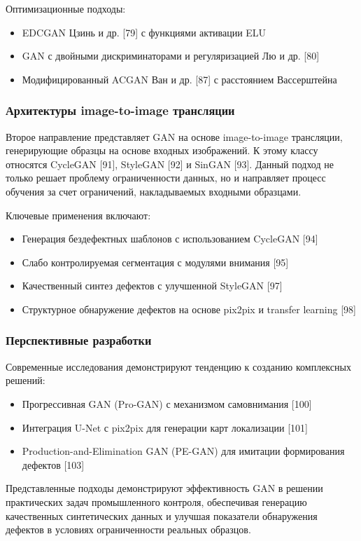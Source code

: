 \documentclass[14pt,a4paper]{article}
\begin{document}
Оптимизационные подходы:
\begin{itemize}
	\item EDCGAN Цзинь и др. [79] с функциями активации ELU
	\item GAN с двойными дискриминаторами и регуляризацией Лю и др. [80]
	\item Модифицированный ACGAN Ван и др. [87] с расстоянием Вассерштейна
\end{itemize}	

\subsubsection{Архитектуры image-to-image трансляции}

Второе направление представляет GAN на основе image-to-image трансляции, генерирующие образцы на основе входных изображений. К этому классу относятся CycleGAN [91], StyleGAN [92] и SinGAN [93]. Данный подход не только решает проблему ограниченности данных, но и направляет процесс обучения за счет ограничений, накладываемых входными образцами.

Ключевые применения включают:
\begin{itemize}
	\item Генерация бездефектных шаблонов с использованием CycleGAN [94]
	\item Слабо контролируемая сегментация с модулями внимания [95]
	\item Качественный синтез дефектов с улучшенной StyleGAN [97]
	\item Структурное обнаружение дефектов на основе pix2pix и transfer learning [98]
\end{itemize}

\subsubsection{Перспективные разработки}
Современные исследования демонстрируют тенденцию к созданию комплексных решений:
\begin{itemize}
	\item Прогрессивная GAN (Pro-GAN) с механизмом самовнимания [100]
	\item Интеграция U-Net с pix2pix для генерации карт локализации [101]
	\item Production-and-Elimination GAN (PE-GAN) для имитации формирования дефектов [103]
\end{itemize}
Представленные подходы демонстрируют эффективность GAN в решении практических задач промышленного контроля, обеспечивая генерацию качественных синтетических данных и улучшая показатели обнаружения дефектов в условиях ограниченности реальных образцов.
\end{document}

